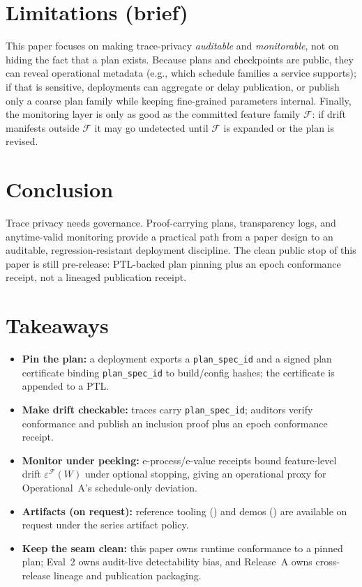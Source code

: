 \documentclass[11pt]{article}
\begin{document}
\section{Limitations (brief)}
\label{sec:c2limitations}
This paper focuses on making trace-privacy \emph{auditable} and \emph{monitorable}, not on hiding the fact that a plan exists.
Because plans and checkpoints are public, they can reveal operational metadata (e.g., which schedule families a service supports); if that is sensitive, deployments can aggregate or delay publication, or publish only a coarse plan family while keeping fine-grained parameters internal.
Finally, the monitoring layer is only as good as the committed feature family $\mathcal{F}$: if drift manifests outside $\mathcal{F}$ it may go undetected until $\mathcal{F}$ is expanded or the plan is revised.

\section{Conclusion}
Trace privacy needs governance.
Proof-carrying plans, transparency logs, and anytime-valid monitoring provide a practical path
from a paper design to an auditable, regression-resistant deployment discipline.
The clean public stop of this paper is still pre-release: PTL-backed plan pinning plus an epoch conformance receipt, not a lineaged publication receipt.

\section{Takeaways}
\begin{itemize}[leftmargin=*]
  \item \textbf{Pin the plan:} a deployment exports a \texttt{plan\_spec\_id} and a signed plan certificate binding \texttt{plan\_spec\_id} to build/config hashes; the certificate is appended to a PTL.
  \item \textbf{Make drift checkable:} traces carry \texttt{plan\_spec\_id}; auditors verify conformance and publish an inclusion proof plus an epoch conformance receipt.
  \item \textbf{Monitor under peeking:} e-process/e-value receipts bound feature-level drift $\varepsilon^{\mathcal{F}}(W)$ under optional stopping, giving an operational proxy for Operational~A's schedule-only deviation.
  \item \textbf{Artifacts (on request):} reference tooling () and demos () are available on request under the series artifact policy.\cite{series:artifactpolicy}
  \item \textbf{Keep the seam clean:} this paper owns runtime conformance to a pinned plan; Eval~2 owns audit-live detectability bias, and Release~A owns cross-release lineage and publication packaging.
\end{itemize}
\end{document}
